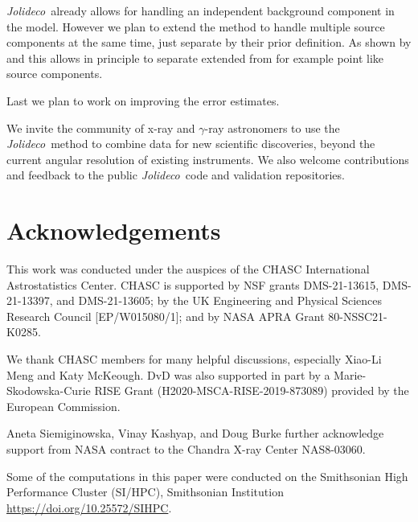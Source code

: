 \documentclass[twocolumn]{aastex631}
\newcommand{\jolideco}{\textit{Jolideco}~}
\newcommand{\gammaray}{$\gamma$-ray\xspace}
\begin{document}
    \jolideco already allows for handling an independent background component in the model. However we plan to extend the method to handle multiple source components at the same time, just separate by their prior definition. As shown by \cite{Selig2015} and \citep{Pumpe2018} this allows in principle to separate extended from for example point like source components.

    Last we plan to work on improving the error estimates. 
    
    We invite the community of x-ray and \gammaray astronomers to use the \jolideco method to combine data for new scientific discoveries, beyond the current angular resolution of existing instruments. We also welcome contributions and feedback to the public \jolideco code and validation repositories. 

    \section*{Acknowledgements}
    This work was conducted under the auspices of the CHASC International Astrostatistics Center.
    CHASC is supported by NSF grants DMS-21-13615, DMS-21-13397, and DMS-21-13605; by the UK Engineering
    and Physical Sciences Research Council [EP/W015080/1]; and by NASA APRA Grant 80-NSSC21-K0285.
    
    We thank CHASC members for many helpful discussions, especially Xiao-Li Meng and Katy McKeough.
    DvD was also supported in part by a Marie-Skodowska-Curie RISE Grant (H2020-MSCA-RISE-2019-873089)
    provided by the European Commission.
    
    Aneta Siemiginowska, Vinay Kashyap, and Doug Burke further acknowledge support from NASA
    contract to the Chandra X-ray Center NAS8-03060.

    Some of the computations in this paper were conducted on the Smithsonian High Performance
    Cluster (SI/HPC), Smithsonian Institution \url{https://doi.org/10.25572/SIHPC}.

    \newpage
    
\end{document}
